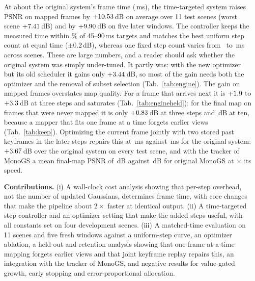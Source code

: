 \documentclass[10pt,twocolumn,letterpaper]{article}
\begin{document}
At about the original system's frame time (\engTestErrorOffMs\,ms), the time-targeted system raises PSNR on mapped frames by $+10.53$\,dB on average over 11 test scenes (worst scene $+7.41$\,dB) and by $+9.90$\,dB on five later windows. The controller keeps the measured time within \engHitMaxPct\% of 45--90\,ms targets and matches the best uniform step count at equal time ($\pm0.2$\,dB), whereas one fixed step count varies from \engFixKTenMsMin\ to \engFixKTenMsMax\,ms across scenes. These are large numbers, and a reader should ask whether the original system was simply under-tuned. It partly was: with the new optimizer but its old scheduler it gains only $+3.44$\,dB, so most of the gain needs both the optimizer and the removal of subset selection (Tab.~\ref{tab:engine}). The gain on mapped frames overstates map quality. For a frame that arrives next it is $+1.9$ to $+3.3$\,dB at three steps and saturates (Tab.~\ref{tab:engineheld}); for the final map on frames that were never mapped it is only $+0.83$\,dB at three steps and \engKeepDTestKOneZeroMinusOrigMean\,dB at ten, because a mapper that fits one frame at a time forgets earlier views (Tab.~\ref{tab:keep}). Optimizing the current frame jointly with two stored past keyframes in the later steps repairs this at \engMsKThreeJr\,ms against \engMsOrig\,ms for the original system: $+3.67$\,dB over the original system on every test scene, and with the tracker of MonoGS a mean final-map PSNR of \engHybKThreeJrPsnr\,dB against \engHybMonoPsnr\,dB for original MonoGS at \engHybSpeedup$\times$ its speed.

\textbf{Contributions.} (i) A wall-clock cost analysis showing that per-step overhead, not the number of updated Gaussians, determines frame time, with core changes that make the pipeline about $2\times$ faster at identical output. (ii) A time-targeted step controller and an optimizer setting that make the added steps useful, with all constants set on four development scenes. (iii) A matched-time evaluation on 11 scenes and five fresh windows against a uniform-step curve, an optimizer ablation, a held-out and retention analysis showing that one-frame-at-a-time mapping forgets earlier views and that joint keyframe replay repairs this, an integration with the tracker of MonoGS, and negative results for value-gated growth, early stopping and error-proportional allocation.
\end{document}
